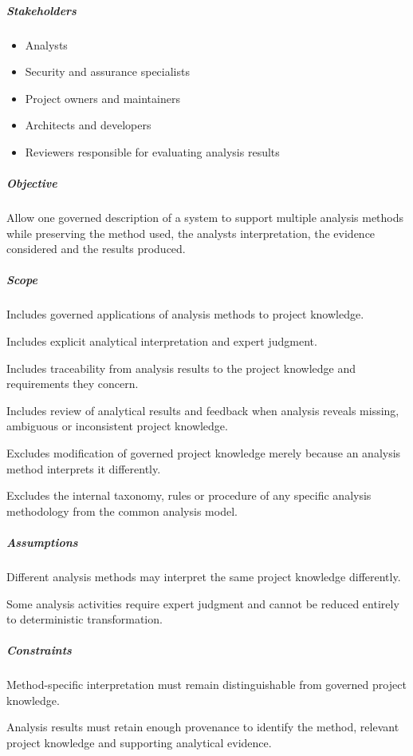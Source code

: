 \documentclass[
  10pt,
]{article}
\providecommand{\tightlist}{%
  \setlength{\itemsep}{0pt}\setlength{\parskip}{0pt}}
\begin{document}
\subparagraph{Stakeholders}\label{stakeholders-6}

\begin{itemize}
\tightlist
\item
  Analysts
\item
  Security and assurance specialists
\item
  Project owners and maintainers
\item
  Architects and developers
\item
  Reviewers responsible for evaluating analysis results
\end{itemize}

\subparagraph{Objective}\label{objective-6}

Allow one governed description of a system to support multiple analysis
methods while preserving the method used, the analyst\textquotesingle s
interpretation, the evidence considered and the results produced.

\subparagraph{Scope}\label{scope-6}

Includes governed applications of analysis methods to project knowledge.

Includes explicit analytical interpretation and expert judgment.

Includes traceability from analysis results to the project knowledge and
requirements they concern.

Includes review of analytical results and feedback when analysis reveals
missing, ambiguous or inconsistent project knowledge.

Excludes modification of governed project knowledge merely because an
analysis method interprets it differently.

Excludes the internal taxonomy, rules or procedure of any specific
analysis methodology from the common analysis model.

\subparagraph{Assumptions}\label{assumptions-1}

Different analysis methods may interpret the same project knowledge
differently.

Some analysis activities require expert judgment and cannot be reduced
entirely to deterministic transformation.

\subparagraph{Constraints}\label{constraints-1}

Method-specific interpretation must remain distinguishable from governed
project knowledge.

Analysis results must retain enough provenance to identify the method,
relevant project knowledge and supporting analytical evidence.
\end{document}
